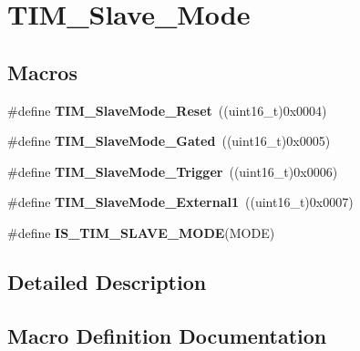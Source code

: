\hypertarget{group___t_i_m___slave___mode}{}\section{T\+I\+M\+\_\+\+Slave\+\_\+\+Mode}
\label{group___t_i_m___slave___mode}
\subsection*{Macros}
\begin{DoxyCompactItemize}
\item 
\hypertarget{group___t_i_m___slave___mode_gaac1cec731f1a5e680a038c4f472f74af}{}\#define {\bfseries T\+I\+M\+\_\+\+Slave\+Mode\+\_\+\+Reset}~((uint16\+\_\+t)0x0004)\label{group___t_i_m___slave___mode_gaac1cec731f1a5e680a038c4f472f74af}

\item 
\hypertarget{group___t_i_m___slave___mode_ga1f36c870b926f70b32f274bbc0bc39a5}{}\#define {\bfseries T\+I\+M\+\_\+\+Slave\+Mode\+\_\+\+Gated}~((uint16\+\_\+t)0x0005)\label{group___t_i_m___slave___mode_ga1f36c870b926f70b32f274bbc0bc39a5}

\item 
\hypertarget{group___t_i_m___slave___mode_ga9e7726c04ee1bafec97226f08adf5677}{}\#define {\bfseries T\+I\+M\+\_\+\+Slave\+Mode\+\_\+\+Trigger}~((uint16\+\_\+t)0x0006)\label{group___t_i_m___slave___mode_ga9e7726c04ee1bafec97226f08adf5677}

\item 
\hypertarget{group___t_i_m___slave___mode_ga34427a693157ab177fead9871185bd35}{}\#define {\bfseries T\+I\+M\+\_\+\+Slave\+Mode\+\_\+\+External1}~((uint16\+\_\+t)0x0007)\label{group___t_i_m___slave___mode_ga34427a693157ab177fead9871185bd35}

\item 
\#define {\bfseries I\+S\+\_\+\+T\+I\+M\+\_\+\+S\+L\+A\+V\+E\+\_\+\+M\+O\+D\+E}(M\+O\+D\+E)
\end{DoxyCompactItemize}


\subsection{Detailed Description}


\subsection{Macro Definition Documentation}
\hypertarget{group___t_i_m___slave___mode_ga7f0e666bc968c56df7f1f6c2465c89fb}{}
